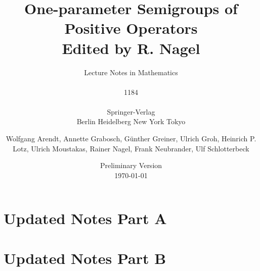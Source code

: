 \documentclass[%
	,graybox
	,envcountsect			%
	]{svmono}
\date{\LARGE Preliminary Version \\ \today}
\begin{document}
\author{Wolfgang Arendt, Annette Grabosch, Günther Greiner, Ulrich Groh, Heinrich P. Lotz, Ulrich Moustakas, Rainer Nagel, Frank Neubrander, Ulf Schlotterbeck}
\title{One-parameter Semigroups of Positive Operators\\
		{\large{Edited by R. Nagel}}}
\subtitle{Lecture Notes in Mathematics\\ \\ 1184\\ \\Springer-Verlag\\ Berlin Heidelberg New York Tokyo}
\maketitle
\frontmatter%

%

%
\tableofcontents

\mainmatter%
%

 























{\RaggedRight

}

\cleardoublepage 
\printindex


\chapter{Updated Notes Part A}
	
\chapter{Updated Notes  Part B}
	
\end{document}
